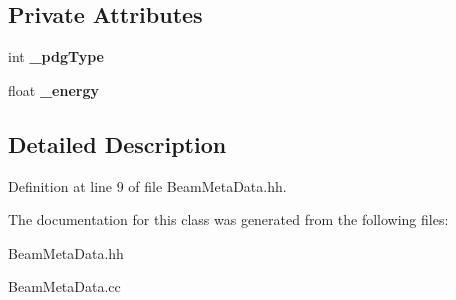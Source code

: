 \subsection*{Private Attributes}
\begin{DoxyCompactItemize}
\item 
int {\bfseries \_\-pdgType}\label{classCALICE_1_1BeamMetaData_a1e3ee81446b50e78dbc12b16b8aac6ee}

\item 
float {\bfseries \_\-energy}\label{classCALICE_1_1BeamMetaData_ad92f231b44646ed3931c6fbcb02f65aa}

\end{DoxyCompactItemize}


\subsection{Detailed Description}


Definition at line 9 of file BeamMetaData.hh.

The documentation for this class was generated from the following files:\begin{DoxyCompactItemize}
\item 
BeamMetaData.hh\item 
BeamMetaData.cc\end{DoxyCompactItemize}
